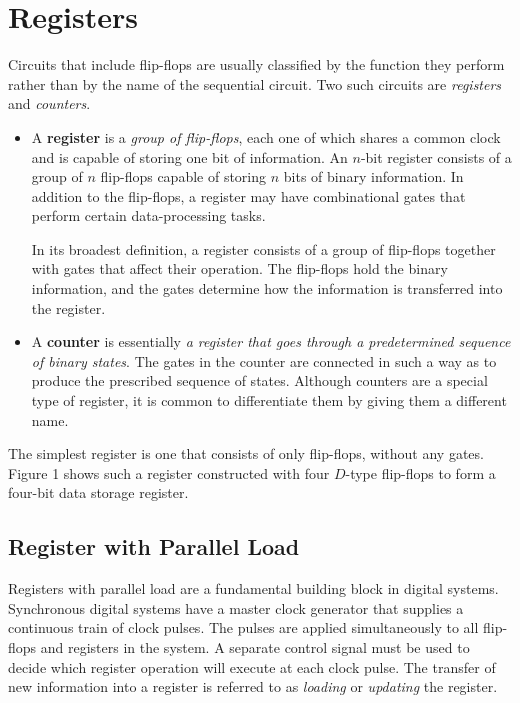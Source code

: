 \section{Registers}
\label{sec:registers}

Circuits that include flip-flops are usually classified by the function they perform rather than by the name of the sequential circuit. Two such circuits are \textit{registers} and \textit{counters}.
\begin{itemize}[leftmargin=0.7cm]
  \item A \textbf{register} is a \textit{group of flip-flops}, each one of which shares a common clock and is capable of storing one bit of information. An $n$-bit register consists of a group of $n$ flip-flops capable of storing $n$ bits of binary information. In addition to the flip-flops, a register may have combinational gates that perform certain data-processing tasks. 

  In its broadest definition, a register consists of a group of flip-flops together with gates that affect their operation. The flip-flops hold the binary information, and the gates determine how the information is transferred into the register.

  \item A \textbf{counter} is essentially \textit{a register that goes through a predetermined sequence of binary states}. The gates in the counter are connected in such a way as to produce the prescribed sequence of states. Although counters are a special type of register, it is common to differentiate them by giving them a different name.
\end{itemize}

\noindent The simplest register is one that consists of only flip-flops, without any gates. Figure 1 shows such a register constructed with four $D$-type flip-flops to form a four-bit data storage register.


\subsection{Register with Parallel Load}
\label{subsec:register-with-parallel-load}

Registers with parallel load are a fundamental building block in digital systems. Synchronous digital systems have a master clock generator that supplies a continuous train of clock pulses. The pulses are applied simultaneously to all flip-flops and registers in the system. A separate control signal must be used to decide which register operation will execute at each clock pulse. The transfer of new information into a register is referred to as \textit{loading} or \textit{updating} the register. 

